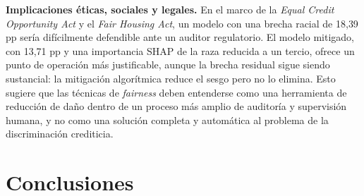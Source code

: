 \documentclass[11pt,a4paper]{article}
\begin{document}
\textbf{Implicaciones éticas, sociales y legales.} En el marco de la \textit{Equal Credit Opportunity
Act} y el \textit{Fair Housing Act}, un modelo con una brecha racial de 18{,}39 pp sería difícilmente
defendible ante un auditor regulatorio. El modelo mitigado, con 13{,}71 pp y una importancia SHAP de
la raza reducida a un tercio, ofrece un punto de operación más justificable, aunque la brecha residual
sigue siendo sustancial: la mitigación algorítmica reduce el sesgo pero no lo elimina. Esto sugiere
que las técnicas de \textit{fairness} deben entenderse como una herramienta de reducción de daño
dentro de un proceso más amplio de auditoría y supervisión humana, y no como una solución completa
y automática al problema de la discriminación crediticia.

\newpage
\section{Conclusiones}
\label{sec:conclusiones}
\end{document}
